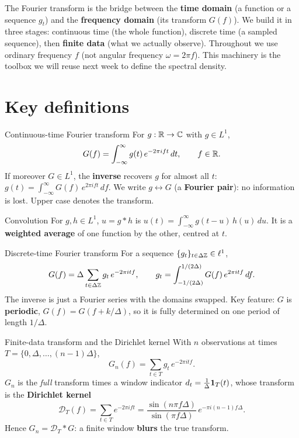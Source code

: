\documentclass[11pt]{article}
\providecommand{\Dir}{\mathcal{D}}
\begin{document}

The Fourier transform is the bridge between the \textbf{time domain} (a function or a sequence $g_t$) and the \textbf{frequency domain} (its transform $G(f)$). We build it in three stages: continuous time (the whole function), discrete time (a sampled sequence), then \textbf{finite data} (what we actually observe). Throughout we use ordinary frequency $f$ (not angular frequency $\omega=2\pi f$). This machinery is the toolbox we will reuse next week to define the spectral density.

\section*{Key definitions}

\begin{defn}{Continuous-time Fourier transform}
For $g:\mathbb{R}\to\mathbb{C}$ with $g\in L^1$,
\[
G(f)=\int_{-\infty}^{\infty} g(t)\,e^{-2\pi i f t}\,dt,\qquad f\in\mathbb{R} .
\]
If moreover $G\in L^1$, the \textbf{inverse} recovers $g$ for almost all $t$: $g(t)=\int_{-\infty}^{\infty} G(f)\,e^{2\pi i f t}\,df$. We write $g\longleftrightarrow G$ (a \textbf{Fourier pair}): no information is lost. Upper case denotes the transform.
\end{defn}

\begin{defn}{Convolution}
For $g,h\in L^1$, $u=g*h$ is $u(t)=\int_{-\infty}^{\infty} g(t-u)\,h(u)\,du$. It is a \textbf{weighted average} of one function by the other, centred at $t$.
\end{defn}

\begin{defn}{Discrete-time Fourier transform}
For a sequence $\{g_t\}_{t\in\Delta\mathbb{Z}}\in\ell^1$,
\[
G(f)=\Delta\sum_{t\in\Delta\mathbb{Z}} g_t\,e^{-2\pi i t f},\qquad
g_t=\int_{-1/(2\Delta)}^{1/(2\Delta)} G(f)\,e^{2\pi i t f}\,df .
\]
The inverse is just a Fourier series with the domains swapped. Key feature: $G$ is \textbf{periodic}, $G(f)=G(f+k/\Delta)$, so it is fully determined on one period of length $1/\Delta$.
\end{defn}

\begin{defn}{Finite-data transform and the Dirichlet kernel}
With $n$ observations at times $T=\{0,\Delta,\dots,(n-1)\Delta\}$,
\[
G_n(f)=\sum_{t\in T} g_t\,e^{-2\pi i t f}.
\]
$G_n$ is the \emph{full} transform times a window indicator $d_t=\tfrac1\Delta\mathbf{1}_T(t)$, whose transform is the \textbf{Dirichlet kernel}
\[
\Dir_T(f)=\sum_{t\in T}e^{-2\pi i f t}=\frac{\sin(n\pi f\Delta)}{\sin(\pi f\Delta)}\,e^{-\pi i(n-1)f\Delta}.
\]
Hence $G_n=\Dir_T * G$: a finite window \textbf{blurs} the true transform.
\end{defn}
\end{document}
